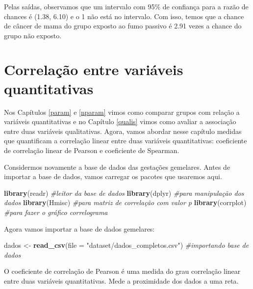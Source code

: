 \documentclass[
]{book}
\newenvironment{Shaded}{\begin{snugshade}}{\end{snugshade}}
\newcommand{\CommentTok}[1]{\textcolor[rgb]{0.56,0.35,0.01}{\textit{#1}}}
\newcommand{\DataTypeTok}[1]{\textcolor[rgb]{0.13,0.29,0.53}{#1}}
\newcommand{\KeywordTok}[1]{\textcolor[rgb]{0.13,0.29,0.53}{\textbf{#1}}}
\newcommand{\NormalTok}[1]{#1}
\newcommand{\StringTok}[1]{\textcolor[rgb]{0.31,0.60,0.02}{#1}}
\begin{document}
Pelas saídas, observamos que um intervalo com 95\% de confiança para a razão de chances é (1.38, 6.10) e o 1 não está no intervalo. Com isso, temos que a chance de câncer de mama do grupo exposto ao fumo passivo é 2.91 vezes a chance do grupo não exposto.

\hypertarget{correlauxe7uxe3o-entre-variuxe1veis-quantitativas}{%
\chapter{Correlação entre variáveis quantitativas}\label{correlauxe7uxe3o-entre-variuxe1veis-quantitativas}}

Nos Capítulos \ref{param} e \ref{nparam} vimos como comparar grupos com relação a variáveis quantitativas e no Capítulo \ref{qualis} vimos como avaliar a associação entre duas variáveis qualitativas. Agora, vamos abordar nesse capítulo medidas que quantificam a correlação linear entre duas variáveis quantitativas: coeficiente de correlação linear de Pearson e coeficiente de Spearman.

Considermos novamente a base de dados das gestações gemelares. Antes de importar a base de dados, vamos carregar os pacotes que usaremos aqui.

\begin{Shaded}
\begin{Highlighting}[]
\KeywordTok{library}\NormalTok{(readr) }\CommentTok{#leitor da base de dados}
\KeywordTok{library}\NormalTok{(dplyr) }\CommentTok{#para manipulação dos dados}
\KeywordTok{library}\NormalTok{(Hmisc)  }\CommentTok{#para matriz de correlação com valor p}
\KeywordTok{library}\NormalTok{(corrplot) }\CommentTok{#para fazer o gráfico correlograma}
\end{Highlighting}
\end{Shaded}

Agora vamos importar a base de dados gemelares:

\begin{Shaded}
\begin{Highlighting}[]
\NormalTok{dados <-}\StringTok{ }\KeywordTok{read_csv}\NormalTok{(}\DataTypeTok{file =} \StringTok{"dataset/dados_completos.csv"}\NormalTok{) }\CommentTok{#importando base de dados}
\end{Highlighting}
\end{Shaded}

O coeficiente de correlação de Pearson é uma medida do grau correlação linear entre duas variáveis quantitativas. Mede a proximidade dos dados a uma reta.
\end{document}
